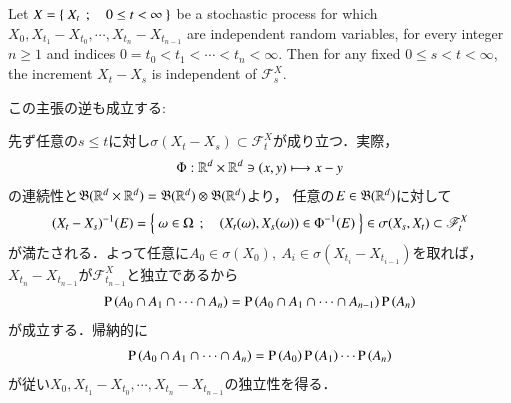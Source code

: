 \begin{screen}
	\begin{thm}\label{thm:application_dynkin_system_theorem_to_independence}
		Let $X = \left\{\ X_t\ \, ; \quad 0 \leq t < \infty\ \right\}$ be a stochastic process 
		for which $X_0,X_{t_1} - X_{t_0}, \cdots, X_{t_n} - X_{t_{n-1}}$ are 
		independent random variables, for every integer $n \geq 1$ and indices 
		$0 = t_0 < t_1 < \cdots < t_n < \infty$. Then for any fixed $0 \leq s < t < \infty$, 
		the increment $X_t - X_s$ is independent of $\mathscr{F}^X_s$.
	\end{thm}
\end{screen}
この主張の逆も成立する:
\begin{prf}
	先ず任意の$s \leq t$に対し$\sigma(X_t - X_s) \subset \mathscr{F}^X_t$が成り立つ．実際，
	\begin{align}
		\Phi:\mathbb{R}^d \times \mathbb{R}^d \ni (x,y) \longmapsto x - y
	\end{align}
	の連続性と$\mathfrak{B}(\mathbb{R}^d \times \mathbb{R}^d) = \mathfrak{B}(\mathbb{R}^d) \otimes \mathfrak{B}(\mathbb{R}^d)$より，
	任意の$E \in \mathfrak{B}(\mathbb{R}^d)$に対して
	\begin{align}
		(X_t - X_s)^{-1}(E) 
		= \left\{\ \omega \in \Omega\ \, ; \quad \left( X_t(\omega),X_s(\omega) \right) \in \Phi^{-1}(E)\ \right\}
		\in \sigma(X_s,X_t) \subset \mathscr{F}^X_t
		\label{eq:thm_application_dynkin_system_theorem_to_independence_1}
	\end{align}
	が満たされる．よって任意に$A_0 \in \sigma(X_0),\ A_i \in \sigma(X_{t_i} - X_{t_{i-1}})$を取れば，
	$X_{t_n} - X_{t_{n-1}}$が$\mathscr{F}^X_{t_{n-1}}$と独立であるから
	\begin{align}
		\operatorname{P} \left(A_0 \cap A_1 \cap \cdots \cap A_n\right)
		= \operatorname{P} \left(A_0 \cap A_1 \cap \cdots \cap A_{n-1}\right) \operatorname{P} \left(A_n\right)
	\end{align}
	が成立する．帰納的に
	\begin{align}
		\operatorname{P} \left(A_0 \cap A_1 \cap \cdots \cap A_n\right)
		= \operatorname{P} \left(A_0\right) \operatorname{P} \left(A_1\right) \cdots \operatorname{P} \left(A_n\right)
	\end{align}
	が従い$X_0,X_{t_1} - X_{t_0}, \cdots, X_{t_n} - X_{t_{n-1}}$の独立性を得る．
	\QED
\end{prf}

